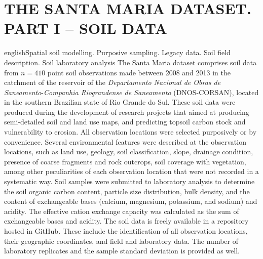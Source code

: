 \artigotrue
\chapter{THE SANTA MARIA DATASET. PART I -- SOIL DATA}
\label{chap:chap04}



\def\enkeys{Spatial soil modelling. Purposive sampling. Legacy data. Soil field description. Soil laboratory 
analysis}
  
\begin{chapterabstract}{english}{\enkeys}
The Santa Maria dataset comprises soil data from $n = 410$ point soil observations made between \num{2008} and 
\num{2013} in the catchment of the reservoir of the \textit{Departamento Nacional de Obras de 
Saneamento}-\textit{Companhia Riograndense de Saneamento} (DNOS-CORSAN), located in the southern Brazilian 
state of Rio Grande do Sul. These soil data were produced during the development of research projects that 
aimed at producing semi-detailed soil and land use maps, and predicting topsoil carbon stock and vulnerability 
to erosion. All observation locations were selected purposively or by convenience. Several environmental 
features were described at the observation locations, such as land use, geology, soil classification, slope, 
drainage condition, presence of coarse fragments and rock outcrops, soil coverage with vegetation, among 
other peculiarities of each observation location that were not recorded in a systematic way. Soil samples were 
submitted to laboratory analysis to determine the soil organic carbon content, particle size distribution, 
bulk density, and the content of exchangeable bases (calcium, magnesium, potassium, and sodium) and acidity. 
The effective cation exchange capacity was calculated as the sum of exchangeable bases and acidity. The soil 
data is freely available in a repository hosted in GitHub. These include the identification of all observation 
locations, their geographic coordinates, and field and laboratory data. The number of laboratory replicates 
and the sample standard deviation is provided as well.
\end{chapterabstract}

